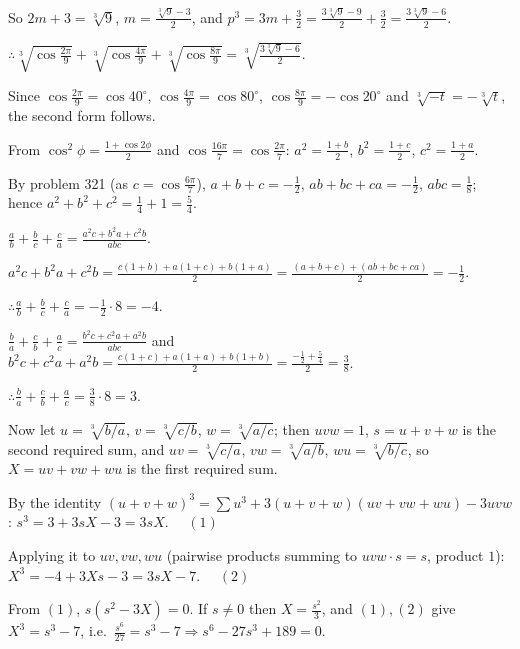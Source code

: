   So $2m + 3 = \sqrt[3]{9}$, $m = \frac{\sqrt[3]{9} - 3}{2}$, and $p^3 = 3m + \frac{3}{2} = \frac{3\sqrt[3]{9} -
    9}{2} + \frac{3}{2} = \frac{3\sqrt[3]{9} - 6}{2}$.

  $\therefore \sqrt[3]{\cos\frac{2\pi}{9}} + \sqrt[3]{\cos\frac{4\pi}{9}} + \sqrt[3]{\cos\frac{8\pi}{9}}
  = \sqrt[3]{\frac{3\sqrt[3]{9} - 6}{2}}$.

  Since $\cos\frac{2\pi}{9} = \cos40^\circ$, $\cos\frac{4\pi}{9} = \cos80^\circ$, $\cos\frac{8\pi}{9} =
  -\cos20^\circ$ and $\sqrt[3]{-t} = -\sqrt[3]{t}$, the second form follows.
\item From $\cos^2\phi = \frac{1 + \cos2\phi}{2}$ and $\cos\frac{16\pi}{7} = \cos\frac{2\pi}{7}$: $a^2 = \frac{1
    + b}{2}$, $b^2 = \frac{1 + c}{2}$, $c^2 = \frac{1 + a}{2}$.

  By problem 321 (as $c = \cos\frac{6\pi}{7}$), $a + b + c = -\frac{1}{2}$, $ab + bc + ca = -\frac{1}{2}$, $abc
  = \frac{1}{8}$; hence $a^2 + b^2 + c^2 = \frac{1}{4} + 1 = \frac{5}{4}$.

  $\frac{a}{b} + \frac{b}{c} + \frac{c}{a} = \frac{a^2c + b^2a + c^2b}{abc}$.

  $a^2c + b^2a + c^2b = \frac{c(1 + b) + a(1 + c) + b(1 + a)}{2} = \frac{(a + b + c) + (ab + bc + ca)}{2} =
  -\frac{1}{2}$.

  $\therefore \frac{a}{b} + \frac{b}{c} + \frac{c}{a} = -\frac{1}{2}\cdot 8 = -4$.

  $\frac{b}{a} + \frac{c}{b} + \frac{a}{c} = \frac{b^2c + c^2a + a^2b}{abc}$ and $b^2c + c^2a + a^2b = \frac{c(1 + c)
    + a(1 + a) + b(1 + b)}{2} = \frac{-\frac{1}{2} + \frac{5}{4}}{2} = \frac{3}{8}$.

  $\therefore \frac{b}{a} + \frac{c}{b} + \frac{a}{c} = \frac{3}{8}\cdot 8 = 3$.

  Now let $u = \sqrt[3]{b/a}$, $v = \sqrt[3]{c/b}$, $w = \sqrt[3]{a/c}$; then $uvw = 1$, $s = u + v + w$ is the
  second required sum, and $uv = \sqrt[3]{c/a}$, $vw = \sqrt[3]{a/b}$, $wu = \sqrt[3]{b/c}$, so $X = uv + vw + wu$
  is the first required sum.

  By the identity $(u + v + w)^3 = \sum u^3 + 3(u + v + w)(uv + vw + wu) - 3uvw$: $s^3 = 3 + 3sX - 3 = 3sX$.
  $\quad (1)$

  Applying it to $uv, vw, wu$ (pairwise products summing to $uvw\cdot s = s$, product $1$): $X^3 = -4 + 3Xs - 3 =
  3sX - 7$. $\quad (2)$

  From $(1)$, $s(s^2 - 3X) = 0$. If $s\neq 0$ then $X = \frac{s^2}{3}$, and $(1), (2)$ give $X^3 = s^3 - 7$, i.e.\
  $\frac{s^6}{27} = s^3 - 7\Rightarrow s^6 - 27s^3 + 189 = 0$.

